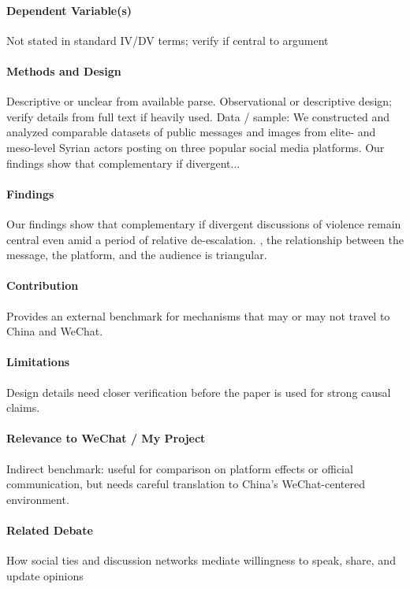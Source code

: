 \documentclass[12pt]{article}
\begin{document}
\paragraph{Dependent Variable(s)} Not stated in standard IV/DV terms; verify if central to argument

\paragraph{Methods and Design} Descriptive or unclear from available parse. Observational or descriptive design; verify details from full text if heavily used. Data / sample: We constructed and analyzed comparable datasets of public messages and images from elite- and meso-level Syrian actors posting on three popular social media platforms. Our findings show that complementary if divergent...

\paragraph{Findings} Our findings show that complementary if divergent discussions of violence remain central even amid a period of relative de-escalation. , the relationship between the message, the platform, and the audience is triangular.

\paragraph{Contribution} Provides an external benchmark for mechanisms that may or may not travel to China and WeChat.

\paragraph{Limitations} Design details need closer verification before the paper is used for strong causal claims.

\paragraph{Relevance to WeChat / My Project} Indirect benchmark: useful for comparison on platform effects or official communication, but needs careful translation to China's WeChat-centered environment.

\paragraph{Related Debate} How social ties and discussion networks mediate willingness to speak, share, and update opinions
\end{document}
